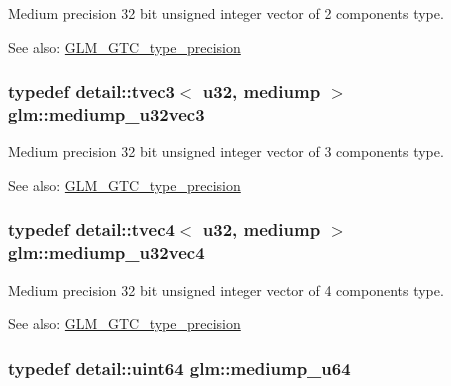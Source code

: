 Medium precision 32 bit unsigned integer vector of 2 components type. \begin{Desc}
\item[See also:]\hyperlink{group__gtc__type__precision}{GLM\_\-GTC\_\-type\_\-precision} \end{Desc}
\hypertarget{group__gtc__type__precision_g84a903ce8834b22f78d80a64eb0181bb}{
\subsubsection[mediump\_\-u32vec3]{\setlength{\rightskip}{0pt plus 5cm}typedef detail::tvec3$<$ u32, mediump $>$ {\bf glm::mediump\_\-u32vec3}}}
\label{group__gtc__type__precision_g84a903ce8834b22f78d80a64eb0181bb}


Medium precision 32 bit unsigned integer vector of 3 components type. \begin{Desc}
\item[See also:]\hyperlink{group__gtc__type__precision}{GLM\_\-GTC\_\-type\_\-precision} \end{Desc}
\hypertarget{group__gtc__type__precision_g532f59ac4c36a7e1371341165f7be33b}{
\subsubsection[mediump\_\-u32vec4]{\setlength{\rightskip}{0pt plus 5cm}typedef detail::tvec4$<$ u32, mediump $>$ {\bf glm::mediump\_\-u32vec4}}}
\label{group__gtc__type__precision_g532f59ac4c36a7e1371341165f7be33b}


Medium precision 32 bit unsigned integer vector of 4 components type. \begin{Desc}
\item[See also:]\hyperlink{group__gtc__type__precision}{GLM\_\-GTC\_\-type\_\-precision} \end{Desc}
\hypertarget{group__gtc__type__precision_g00c51a16fa190b0a90205d50d6d8a44a}{
\subsubsection[mediump\_\-u64]{\setlength{\rightskip}{0pt plus 5cm}typedef detail::uint64 {\bf glm::mediump\_\-u64}}}
\label{group__gtc__type__precision_g00c51a16fa190b0a90205d50d6d8a44a}


